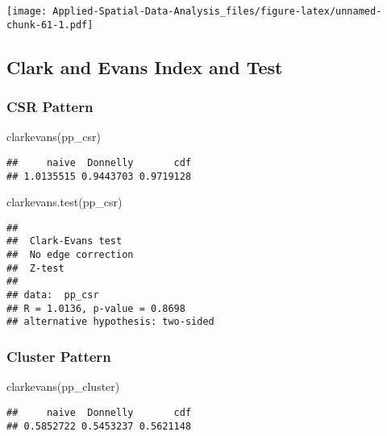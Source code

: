 \documentclass[
]{book}
\newenvironment{Shaded}{\begin{snugshade}}{\end{snugshade}}
\newcommand{\FunctionTok}[1]{\textcolor[rgb]{0.00,0.00,0.00}{#1}}
\newcommand{\NormalTok}[1]{#1}
\begin{document}
\texttt{[image: Applied-Spatial-Data-Analysis\_files/figure-latex/unnamed-chunk-61-1.pdf]}

\hypertarget{clark-and-evans-index-and-test}{%
\subsection{Clark and Evans Index and Test}\label{clark-and-evans-index-and-test}}

\hypertarget{csr-pattern-2}{%
\subsubsection{CSR Pattern}\label{csr-pattern-2}}

\begin{Shaded}
\begin{Highlighting}[]
\FunctionTok{clarkevans}\NormalTok{(pp\_csr)}
\end{Highlighting}
\end{Shaded}

\begin{verbatim}
##     naive  Donnelly       cdf 
## 1.0135515 0.9443703 0.9719128
\end{verbatim}

\begin{Shaded}
\begin{Highlighting}[]
\FunctionTok{clarkevans.test}\NormalTok{(pp\_csr)}
\end{Highlighting}
\end{Shaded}

\begin{verbatim}
## 
##  Clark-Evans test
##  No edge correction
##  Z-test
## 
## data:  pp_csr
## R = 1.0136, p-value = 0.8698
## alternative hypothesis: two-sided
\end{verbatim}

\hypertarget{cluster-pattern-2}{%
\subsubsection{Cluster Pattern}\label{cluster-pattern-2}}

\begin{Shaded}
\begin{Highlighting}[]
\FunctionTok{clarkevans}\NormalTok{(pp\_cluster)}
\end{Highlighting}
\end{Shaded}

\begin{verbatim}
##     naive  Donnelly       cdf 
## 0.5852722 0.5453237 0.5621148
\end{verbatim}
\end{document}
